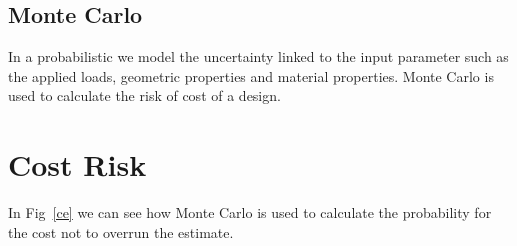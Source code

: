 \documentclass[twocolumn]{revtex4}
\begin{document}
\subsection{Monte Carlo}

In a probabilistic we model the uncertainty linked to the input parameter such as the applied loads, geometric properties and material properties. Monte Carlo is used to calculate the risk of cost of a design. 


\section{Cost Risk}


In Fig~\ref{ce} we can see how Monte Carlo is used to calculate the probability for the cost not to overrun the estimate. 


\begin{figure}[h]
\end{figure}


\end{document}
